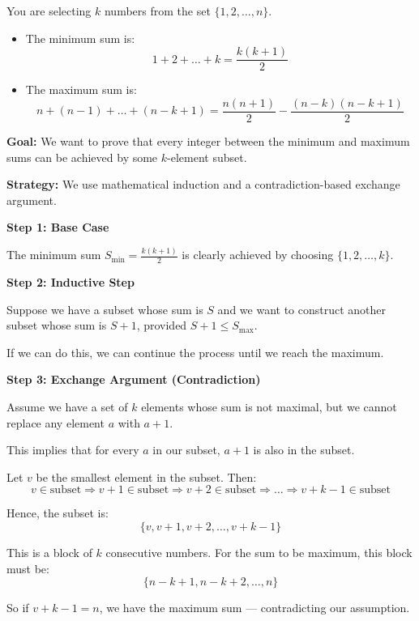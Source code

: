 \documentclass[12pt]{article}
\begin{document}
You are selecting $k$ numbers from the set $\{1, 2, \dots, n\}$.

\begin{itemize}
    \item The minimum sum is:
    $$1 + 2 + \dots + k = \frac{k(k+1)}{2}$$
    
    \item The maximum sum is:
    $$n + (n-1) + \dots + (n-k+1) = \frac{n(n+1)}{2} - \frac{(n-k)(n-k+1)}{2}$$
\end{itemize}

\bigskip

\textbf{Goal:} We want to prove that every integer between the minimum and maximum sums can be achieved by some $k$-element subset.

\bigskip

\textbf{Strategy:} We use mathematical induction and a contradiction-based exchange argument.

\bigskip

\textbf{Step 1: Base Case}

The minimum sum $S_{\text{min}} = \frac{k(k+1)}{2}$ is clearly achieved by choosing $\{1, 2, \dots, k\}$.

\bigskip

\textbf{Step 2: Inductive Step}

Suppose we have a subset whose sum is $S$ and we want to construct another subset whose sum is $S+1$, provided $S + 1 \leq S_{\text{max}}$.

If we can do this, we can continue the process until we reach the maximum.

\bigskip

\textbf{Step 3: Exchange Argument (Contradiction)}

Assume we have a set of $k$ elements whose sum is not maximal, but we cannot replace any element $a$ with $a+1$.

This implies that for every $a$ in our subset, $a+1$ is also in the subset.

Let $v$ be the smallest element in the subset. Then:
$$v \in \text{subset} \Rightarrow v+1 \in \text{subset} \Rightarrow v+2 \in \text{subset} \Rightarrow \dots \Rightarrow v + k - 1 \in \text{subset}$$

Hence, the subset is:
$$\{v, v+1, v+2, \dots, v+k-1\}$$

This is a block of $k$ consecutive numbers. For the sum to be maximum, this block must be:
$$\{n-k+1, n-k+2, \dots, n\}$$

So if $v + k - 1 = n$, we have the maximum sum — contradicting our assumption.
\end{document}
